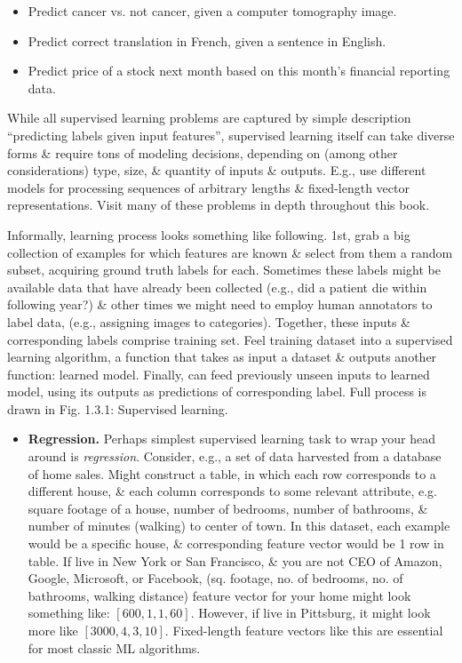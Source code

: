 \documentclass{article}
\begin{document}
\begin{itemize}
\begin{itemize}
\begin{itemize}
			\begin{itemize}
				\item Predict cancer vs. not cancer, given a computer tomography image.
				\item Predict correct translation in French, given a sentence in English.
				\item Predict price of a stock next month based on this month's financial reporting data.
			\end{itemize}
			While all supervised learning problems are captured by simple description ``predicting labels given input features'', supervised learning itself can take diverse forms \& require tons of modeling decisions, depending on (among other considerations) type, size, \& quantity of inputs \& outputs. E.g., use different models for processing sequences of arbitrary lengths \& fixed-length vector representations. Visit many of these problems in depth throughout this book.

			Informally, learning process looks something like following. 1st, grab a big collection of examples for which features are known \& select from them a random subset, acquiring ground truth labels for each. Sometimes these labels might be available data that have already been collected (e.g., did a patient die within following year?) \& other times we might need to employ human annotators to label data, (e.g., assigning images to categories). Together, these inputs \& corresponding labels comprise training set. Feel training dataset into a supervised learning algorithm, a function that takes as input a dataset \& outputs another function: learned model. Finally, can feed previously unseen inputs to learned model, using its outputs as predictions of corresponding label. Full process is drawn in {\sf Fig. 1.3.1: Supervised learning}.
			\begin{itemize}
				\item {\bf Regression.} Perhaps simplest supervised learning task to wrap your head around is {\it regression}. Consider, e.g., a set of data harvested from a database of home sales. Might construct a table, in which each row corresponds to a different house, \& each column corresponds to some relevant attribute, e.g. square footage of a house, number of bedrooms, number of bathrooms, \& number of minutes (walking) to center of town. In this dataset, each example would be a specific house, \& corresponding feature vector would be 1 row in table. If live in New York or San Francisco, \& you are not CEO of Amazon, Google, Microsoft, or Facebook, (sq. footage, no. of bedrooms, no. of bathrooms, walking distance) feature vector for your home might look something like: $[600,1,1,60]$. However, if live in Pittsburg, it might look more like $[3000,4,3,10]$. Fixed-length feature vectors like this are essential for most classic ML algorithms.


\end{itemize}
\end{itemize}
\end{itemize}
\end{itemize}
\end{document}
